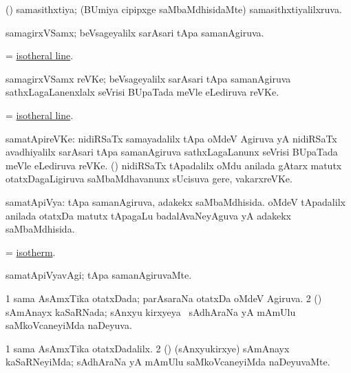 \bentry
{}
\gl{\gu}
\bmng
(\BUvi) samasithxtiya; (BUmiya cipipxge saMbaMdhisidaMte) samasithxtiyalilxruva. 
\emng
\eentry

\bentry
{}
\gl{\nA}
\bmng
samagirxVSamx; beVsageyalilx sarAsari tApa samanAgiruva. 
\emng
\eentry

\bentry
{}
\gl{\nA}
\bmng
=  \hyperlink{isotheral line}{isotheral line}. 
\emng
\eentry

\bentry
{}
\gl{\nA}
\bmng
samagirxVSamx reVKe; beVsageyalilx sarAsari tApa samanAgiruva sathxLagaLanenxlalx seVrisi BUpaTada meVle eLediruva reVKe. 
\emng
\eentry

\bentry
{}
\gl{\nA}
\bmng
=  \hyperlink{isotheral line}{isotheral line}. 
\emng
\eentry

\bentry
{}
\gl{\nA}
\bmng
samatApireVKe: 
\banum
{} nidiRSaTx samayadalilx tApa oMdeV Agiruva yA nidiRSaTx avadhiyalilx sarAsari tApa samanAgiruva sathxLagaLanunx seVrisi BUpaTada meVle eLediruva reVKe. 
 (\Bwvi) nidiRSaTx tApadalilx oMdu anilada gAtarx matutx otatxDagaLigiruva saMbaMdhavanunx sUcisuva gere, vakarxreVKe. 
\eanum
\emng
\eentry

\bentry
{}
\gl{\gu}
\bmng
samatApiVya: 
\banum
{} tApa samanAgiruva, adakekx saMbaMdhisida. 
 oMdeV tApadalilx anilada otatxDa matutx tApagaLu badalAvaNeyAguva yA adakekx saMbaMdhisida. 
\eanum
\emng
\eentry

\bentry
{}
\gl{\nA}
\bmng
=  \hyperlink{isotherm}{isotherm}. 
\emng
\eentry

\bentry
{}
\gl{\kirxvi}
\bmng
samatApiVyavAgi; tApa samanAgiruvaMte. 
\emng
\eentry

\bentry
{}
\gl{\gu}
\bmng
\bnum
\num{1} sama AsAmxTika otatxDada; parAsaraNa otatxDa oMdeV Agiruva. 
\num{2} (\shavi) sAmAnayx kaSaRNada; sAnxyu kirxyeya \vi\ sAdhAraNa yA mAmUlu saMkoVcaneyiMda naDeyuva. 
\enum
\emng
\eentry

\bentry
{}
\gl{\kirxvi}
\bmng
\bnum
\num{1} sama AsAmxTika otatxDadalilx. 
\num{2} (\shavi) (sAnxyukirxye) sAmAnayx kaSaRNeyiMda; sAdhAraNa yA mAmUlu saMkoVcaneyiMda naDeyuvaMte. 
\enum
\emng
\eentry

